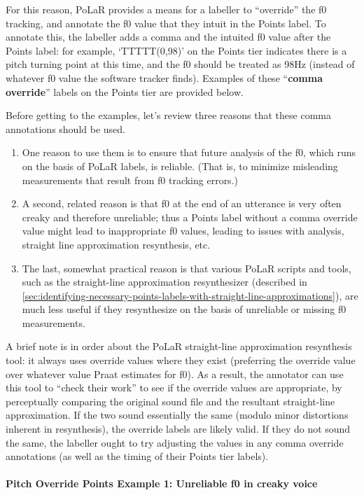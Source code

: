 \documentclass[11pt, twoside]{memoir}
\begin{document}
For this reason, PoLaR provides a means for a labeller to “override” the f0 tracking, and annotate the f0 value that they intuit in the Points label. To annotate this, the labeller adds a comma and the intuited f0 value after the Points label: for example, ‘TTTTT(0,98)’ on the Points tier indicates there is a pitch turning point at this time, and the f0 should be treated as 98Hz (instead of whatever f0 value the software tracker finds). Examples of these “\textbf{comma override}” labels on the Points tier are provided below.

Before getting to the examples, let’s review three reasons that these comma annotations should be used.
\begin{enumerate}
	\item One reason to use them is to ensure that future analysis of the f0, which runs on the basis of PoLaR labels, is reliable. (That is, to minimize misleading measurements that result from f0 tracking errors.)
	\item A second, related reason is that f0 at the end of an utterance is very often creaky and therefore unreliable; thus a Points label without a comma override value might lead to inappropriate f0 values, leading to issues with analysis, straight line approximation resynthesis, etc.
	\item The last, somewhat practical  reason is that various PoLaR scripts and tools, such as the straight-line approximation resynthesizer (described in \ref{sec:identifying-necessary-points-labels-with-straight-line-approximations}), are much less useful if they resynthesize on the basis of unreliable or missing f0 measurements.
\end{enumerate}

A brief note is in order about the PoLaR straight-line approximation resynthesis tool: it always uses override values where they exist (preferring the override value over whatever value Praat estimates for f0). As a result, the annotator can use this tool to “check their work” to see if the override values are appropriate, by perceptually comparing the original sound file and the resultant straight-line approximation. If the two sound essentially the same (modulo minor distortions inherent in resynthesis), the override labels are likely valid. If they do not sound the same, the labeller ought to try adjusting the values in any comma override annotations (as well as the timing of their Points tier labels).

\paragraph{Pitch Override Points Example 1: Unreliable f0 in creaky voice\label{pitch-override-points-example-1}}
\end{document}
